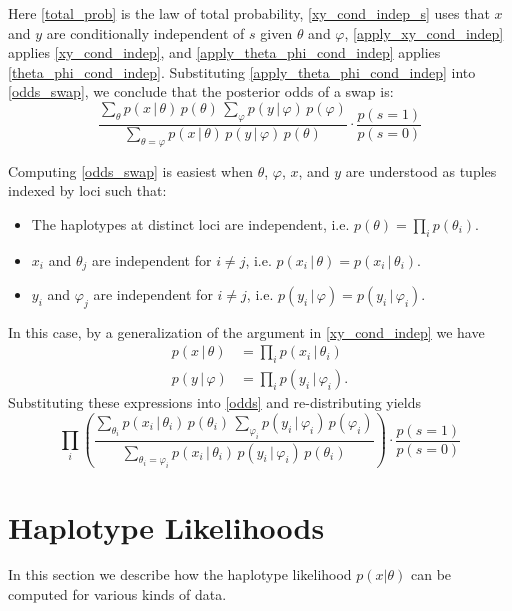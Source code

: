 \documentclass[12pt]{article}
\begin{document}
Here \eqref{total_prob} is the law of total probability, \eqref{xy_cond_indep_s} uses that $x$ and $y$ are conditionally independent of $s$ given $\theta$ and $\varphi$, \eqref{apply_xy_cond_indep} applies \eqref{xy_cond_indep}, and \eqref{apply_theta_phi_cond_indep} applies \eqref{theta_phi_cond_indep}.  Substituting \eqref{apply_theta_phi_cond_indep} into \eqref{odds_swap}, we conclude that the posterior odds of a swap is:
\begin{equation}
\label{odds}
\boxed{\frac{\sum_\theta p(x \, | \, \theta) \, p(\theta) \, \sum_{\varphi} p(y \, | \, \varphi) \, p(\varphi)}{\sum_{\theta = \varphi} p(x \, | \, \theta) \, p(y \, | \, \varphi) \, p(\theta)} \cdot \frac{p(s=1)}{p(s=0)}}
\end{equation}

Computing \eqref{odds_swap} is easiest when $\theta$, $\varphi$, $x$, and $y$ are understood as tuples indexed by loci such that:
\begin{itemize}
\item The haplotypes at distinct loci are independent, i.e. $p(\theta) = \prod_i p(\theta_i)$.
\item $x_i$ and $\theta_j$ are independent for $i \neq j$, i.e. $p(x_i \, | \, \theta) = p(x_i \, | \, \theta_i)$.
\item $y_i$ and $\varphi_j$ are independent for $i \neq j$, i.e. $p(y_i \, | \, \varphi) = p(y_i \, | \, \varphi_i)$.
\end{itemize}
In this case, by a generalization of the argument in \eqref{xy_cond_indep} we have
\begin{align*}
p(x \, | \, \theta) &= \textstyle\prod\limits_i p(x_i \, | \, \theta_i) \\
p(y \, | \, \varphi) &= \textstyle\prod\limits_i p(y_i \, | \, \varphi_i).
\end{align*}
Substituting these expressions into \eqref{odds} and re-distributing yields
\begin{equation}
\boxed{\prod_i \left(\frac{\sum_{\theta_i} p(x_i \, | \, \theta_i) \, p(\theta_i) \, \sum_{\varphi_i} p(y_i \, | \, \varphi_i) \, p(\varphi_i)}{\sum_{\theta_i = \varphi_i} p(x_i \, | \, \theta_i) \, p(y_i \, | \, \varphi_i) \, p(\theta_i)}\right) \cdot \frac{p(s=1)}{p(s=0)}}
\label{odds_many}
\end{equation}

\section{Haplotype Likelihoods}
In this section we describe how the haplotype likelihood $p(x|\theta)$ can be computed for various kinds of data.
\end{document}
